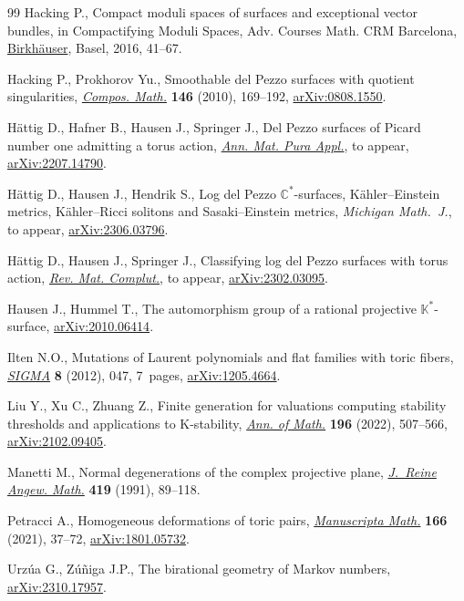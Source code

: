 \documentclass[10pt,a4paper]{amsart}
\theoremstyle{definition}
\begin{document}
\begin{thebibliography}{99}
Hacking P., Compact moduli spaces of surfaces and exceptional vector bundles,
 in Compactifying Moduli Spaces, Adv. Courses Math. CRM Barcelona,
 \href{https://doi.org/10.1007/978-3-0348-0921-4_2}{Birkh\"auser}, Basel,
 2016, 41--67.

Hacking P., Prokhorov Yu., Smoothable del {P}ezzo surfaces with quotient
 singularities,
 \href{https://doi.org/10.1112/S0010437X09004370}{\textit{Compos. Math.}}
 \textbf{146} (2010), 169--192,
 \href{http://arxiv.org/abs/0808.1550}{arXiv:0808.1550}.

H\"attig D., Hafner B., Hausen J., Springer J., Del {P}ezzo surfaces of
 {P}icard number one admitting a torus action,
 \href{https://doi.org/10.1007/s10231-025-01552-5}{\textit{Ann. Mat. Pura
 Appl.}}, {t}o appear,
 \href{http://arxiv.org/abs/2207.14790}{arXiv:2207.14790}.

H\"attig D., Hausen J., Hendrik S., Log del Pezzo $\mathbb{C}^*$-surfaces,
 {K}\"ahler--{E}instein metrics, {K}\"ahler--{R}icci solitons and
 {S}asaki--{E}instein metrics, \textit{Michigan Math.~J.}, {t}o appear,
 \href{http://arxiv.org/abs/2306.03796}{arXiv:2306.03796}.

H\"attig D., Hausen J., Springer J., Classifying log del {P}ezzo surfaces with
 torus action, \href{https://doi.org/10.1007/s13163-025-00526-8}{\textit{Rev.
 Mat. Complut.}}, {t}o appear,
 \href{http://arxiv.org/abs/2302.03095}{arXiv:2302.03095}.

Hausen J., Hummel T., The automorphism group of a rational projective
 {$\mathbb{K}^*$}-surface,
 \href{http://arxiv.org/abs/2010.06414}{arXiv:2010.06414}.

Ilten N.O., Mutations of {L}aurent polynomials and flat families with toric
 fibers, \href{https://doi.org/10.3842/SIGMA.2012.047}{\textit{SIGMA}}
 \textbf{8} (2012), 047, 7~pages,
 \href{http://arxiv.org/abs/1205.4664}{arXiv:1205.4664}.

Liu Y., Xu C., Zhuang Z., Finite generation for valuations computing stability
 thresholds and applications to {K}-stability,
 \href{https://doi.org/10.4007/annals.2022.196.2.2}{\textit{Ann. of Math.}}
 \textbf{196} (2022), 507--566,
 \href{http://arxiv.org/abs/2102.09405}{arXiv:2102.09405}.

Manetti M., Normal degenerations of the complex projective plane,
 \href{https://doi.org/10.1515/crll.1991.419.89}{\textit{J.~Reine Angew.
 Math.}} \textbf{419} (1991), 89--118.

Petracci A., Homogeneous deformations of toric pairs,
 \href{https://doi.org/10.1007/s00229-020-01219-w}{\textit{Manuscripta Math.}}
 \textbf{166} (2021), 37--72,
 \href{http://arxiv.org/abs/1801.05732}{arXiv:1801.05732}.

Urz\'ua G., Z\'u\~niga J.P., The birational geometry of {M}arkov numbers,
 \href{http://arxiv.org/abs/2310.17957}{arXiv:2310.17957}.

\end{thebibliography}
\end{document}
